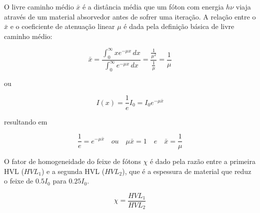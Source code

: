 \documentclass[11pt,a4paper]{article}
\begin{document}
            O livre caminho médio $\bar{x}$ é a distância média que um fóton com energia $h \nu$ viaja através de um material absorvedor antes de sofrer uma iteração.  A relação entre o $\bar{x}$ e o coeficiente de atenuação linear $\mu$ é dada pela definição básica de livre caminho médio:

            \begin{equation}
                \bar{x} = \frac{\int_{0}^{\infty} x e^{- \mu x} \,dx }{\int_{0}^{\infty} e^{- \mu x} \,dx } = 
                \frac{\frac{1}{\mu^2}}{\frac{1}{\mu}} = \frac{1}{\mu}
            \end{equation}

            \noindent ou

                \begin{equation}
                    I(x) = \frac{1}{e}I_0 = I_0 e^{-\mu \bar{x}}
                \end{equation}

            \noindent resultando em

                \begin{equation}
                    \frac{1}{e} = e^{-\mu \bar{x}} \quad ou \quad \mu \bar{x} = 1 \quad e \quad \bar{x} = \frac{1}{\mu}
                \end{equation}

            O fator de homogeneidade do feixe de fótons $\chi $ é dado pela razão entre a primeira HVL ($HVL_1$) e a segunda HVL ($HVL_2$),  que é a espessura de material que reduz o feixe de $0.5I_0$ para $0.25I_0$.

                \begin{equation}
                    \chi = \frac{HVL_1}{HVL_2}
                \end{equation}
\end{document}
